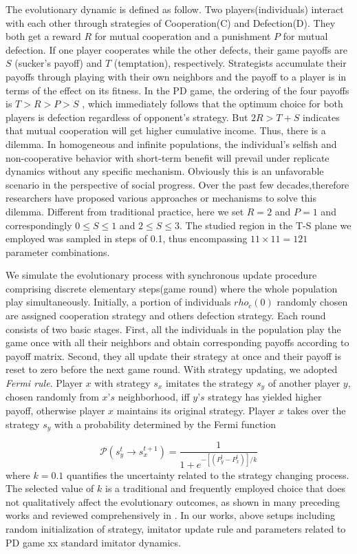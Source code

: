 \documentclass[preprint,12pt,3p]{elsarticle}
\begin{document}
\label{game model}
The evolutionary dynamic is defined as follow.
Two players(individuals) interact with each other through strategies of Cooperation(C) and
Defection(D).
They both get a reward $R$ for mutual cooperation and a punishment $P$ for mutual defection.
If one player cooperates while the other defects, their game payoffs are $S$
(sucker's payoff) and $T$ (temptation), respectively.
Strategists accumulate their payoffs through playing with their own neighbors and the payoff
to a player is in terms of the effect on its fitness.
In the PD game, the ordering of the four payoffs is $T > R > P > S$ , which immediately follows
that the optimum choice for both players is defection regardless of opponent's strategy.
But $2R > T+S$ indicates that mutual cooperation will get higher cumulative income.
Thus, there is a dilemma.
In homogeneous and infinite populations, the individual's selfish and non-cooperative behavior
with short-term benefit will prevail under replicate dynamics  without any specific mechanism.
Obviously this is an unfavorable scenario in the perspective of social progress.
\label{sovle dilemma}Over the past few decades,therefore researchers have proposed various
approaches or mechanisms to solve this dilemma.
Different from traditional practice, here we set $R=2$ and $P=1$ and
correspondingly $0\leq S \leq1$ and $2\leq S \leq3$.
The studied region in the T-S plane we employed was sampled in steps of 0.1,
thus encompassing $11 \times 11=121$ parameter combinations.


We simulate the evolutionary process with synchronous update procedure comprising
discrete elementary steps(game round) where the whole population play simultaneously.
Initially, a portion of individuals  $rho_c (0)$ randomly chosen are assigned cooperation strategy and others defection strategy.
Each round consists of two basic stages.
First, all the individuals in the population play the game once with all their neighbors and obtain
corresponding payoffs according to payoff matrix.
Second, they all update their strategy at once and their payoff is reset to zero before the next
game round.
With strategy updating, we adopted \textit{Fermi rule}\cite{SzabóTőke-18257}.
Player $x$ with strategy $s_x$ imitates the strategy $s_y$ of another player $y$,
chosen randomly from $x’s$ neighborhood, iff $y’s$ strategy has yielded higher payoff,
otherwise player $x$ maintains its original strategy.
Player $x$ takes over the strategy $s_y$  with a probability determined by
the Fermi function

\begin{equation}
\mathcal{P}(s_y^t\rightarrow s_x^{t+1})=\frac{1}{1+e^{-[(P_y^t-P_x^t)]/k}}
\end{equation}
where $k=0.1$ quantifies the uncertainty related to the strategy changing process.
The selected value of $k$ is a traditional and frequently employed choice that does
not qualitatively affect the evolutionary outcomes, as shown in many preceding
works and reviewed comprehensively in \cite{szabo2007evolutionary,wang2014degree}.
In our works, above setups including random initialization of strategy, imitator update rule and parameters
related to PD game xx standard imitator dynamics.
\end{document}
